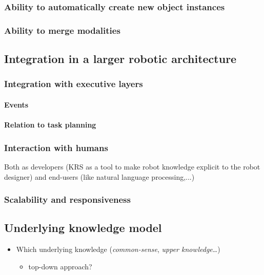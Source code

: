 \documentclass[a4paper]{article}
\begin{document}
\subsubsection{Ability to automatically create new object instances}
\label{sect|new-instances}

\subsubsection{Ability to merge modalities}
\label{sect|modalities-merging}

\subsection{Integration in a larger robotic architecture}
\label{sect|integration-robot}

\subsubsection{Integration with executive layers}
\label{sect|integration-executive-layers}

\paragraph{Events}

\paragraph{Relation to task planning}

\subsubsection{Interaction with humans}
\label{sect|hri}

Both as developers (KRS as a tool to make robot knowledge explicit to the
robot designer) and end-users (like natural language processing,...)

\subsubsection{Scalability and responsiveness}
\label{sect|scalability}


\subsection{Underlying knowledge model}

\begin{itemize}
	\item  Which underlying knowledge (\emph{common-sense}, \emph{upper knowledge}\ldots{})
	\begin{itemize}
		\item  top-down approach?
	\end{itemize}

\end{itemize}
\end{document}
